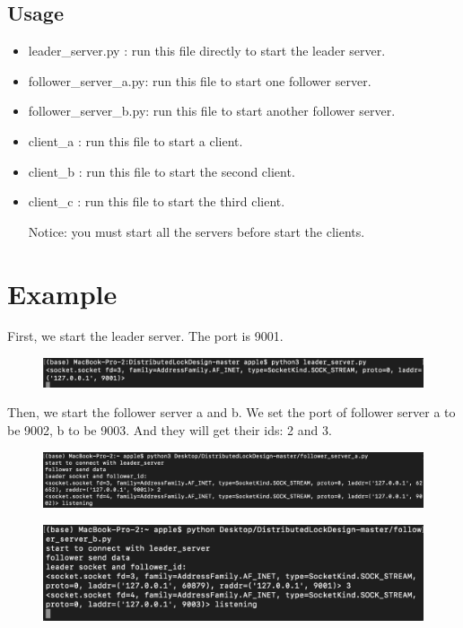 \documentclass[10pt]{article}
\begin{document}
\subsection{Usage}


\begin{itemize}
  \item leader\_server.py : run this file directly to start the leader server.
  \item follower\_server\_a.py: run this file to start one follower server.
  \item follower\_server\_b.py: run this file to start another follower server.
  \item client\_a : run this file to start a client.
  \item client\_b : run this file to start the second client.
  \item client\_c : run this file to start the third client.

  Notice: you must start all the servers before start the clients.
\end{itemize}


\section{Example}

First, we start the leader server. The port is 9001.

\begin{figure}[H]
\centerline{\includegraphics[width = 1\textwidth]{screenshot//leader_01.png}}
\end{figure}

Then, we start the follower server a and b. We set the port of follower server a to be 9002, b to be 9003. And they will get their ids: 2 and 3.

\begin{figure}[H]
\centerline{\includegraphics[width = 1\textwidth]{screenshot//follower_a_01.png}}
\end{figure}

\begin{figure}[H]
\centerline{\includegraphics[width = 1\textwidth]{screenshot//follower_b_01.png}}
\end{figure}
\end{document}
